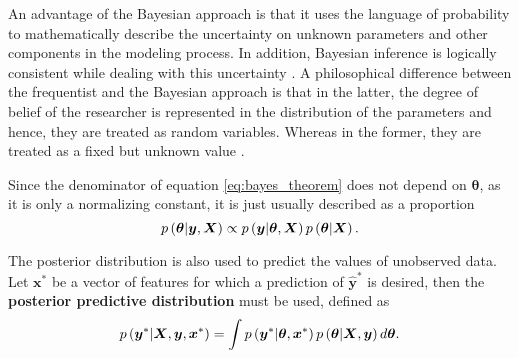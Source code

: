 An advantage of the Bayesian approach is that it uses the language of probability to mathematically describe the uncertainty on unknown parameters and other components in the modeling process.
In addition, Bayesian inference is logically consistent while dealing with this uncertainty \cite{cox1946probability, cox1963algebra, jaynes2003probability, o2004advanced}. A philosophical difference between the frequentist and the Bayesian approach is that in the latter, the degree of belief of the researcher is represented in the distribution of the parameters and hence, they are treated as random variables. Whereas in the former, they are treated as a fixed but unknown value \cite{o2004advanced}.

Since the denominator of equation \eqref{eq:bayes_theorem} does not depend on $\boldsymbol{\theta}$, as it is only a normalizing constant, it is just usually described as a proportion
\begin{equation}
  \label{eq:bayes_theorem_prop}
    p\left( \boldsymbol{\theta} | \boldsymbol{y}, \boldsymbol{X} \right) \propto p\left( \boldsymbol{y} | \boldsymbol{\theta}, \boldsymbol{X} \right) p\left( \boldsymbol{\theta} | \boldsymbol{X} \right).
\end{equation}

The posterior distribution is also used to predict the values of unobserved data. Let $\boldsymbol{x}^*$ be a vector of features for which a prediction of $\hat{\boldsymbol{y}}^*$ is desired, then the \textbf{posterior predictive distribution} must be used, defined as
\begin{equation}
  \label{eq:post_pred_dist}
  p\left( \boldsymbol{y}^* | \boldsymbol{X}, \boldsymbol{y}, \boldsymbol{x}^* \right) = \int p\left( \boldsymbol{y}^* | \boldsymbol{\theta}, \boldsymbol{x}^* \right) p\left( \boldsymbol{\theta} | \boldsymbol{X}, \boldsymbol{y} \right) d\boldsymbol{\theta}.
\end{equation}

